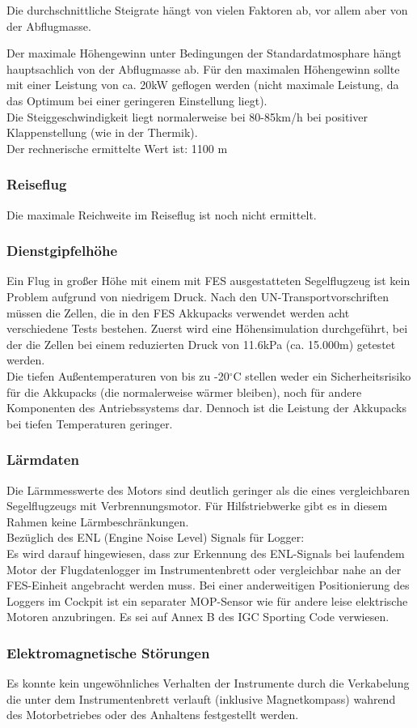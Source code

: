 Die durchschnittliche Steigrate hängt von vielen Faktoren ab, vor allem aber von der Abflugmasse.

Der maximale Höhengewinn unter Bedingungen der Standardatmosphare hängt hauptsachlich von der Abflugmasse ab. Für den maximalen Höhengewinn sollte mit einer Leistung von ca. 20kW geflogen werden (nicht maximale Leistung, da das Optimum bei einer geringeren Einstellung liegt).\\ 
Die Steiggeschwindigkeit liegt normalerweise bei 80-85km/h bei positiver Klappenstellung (wie in der Thermik).\\
Der rechnerische ermittelte Wert ist: 1100 m 

\subsubsection{Reiseflug}
Die maximale Reichweite im Reiseflug ist noch nicht ermittelt. 

\subsubsection{Dienstgipfelhöhe}
Ein Flug in großer Höhe mit einem mit FES ausgestatteten Segelflugzeug ist kein Problem aufgrund von niedrigem Druck. Nach den UN-Transportvorschriften müssen die Zellen, die in den FES Akkupacks verwendet werden acht verschiedene Tests bestehen. Zuerst wird eine Höhensimulation durchgeführt, bei der die Zellen bei einem reduzierten Druck von 11.6kPa (ca. 15.000m) getestet werden.\\

Die tiefen Außentemperaturen von bis zu -20$^\circ$C stellen weder ein Sicherheitsrisiko für
die Akkupacks (die normalerweise wärmer bleiben), noch für andere Komponenten des Antriebssystems dar. Dennoch ist die Leistung der Akkupacks bei tiefen Temperaturen geringer.

\subsubsection{Lärmdaten} 
Die Lärmmesswerte des Motors sind deutlich geringer als die eines vergleichbaren Segelflugzeugs mit Verbrennungsmotor.
Für Hilfstriebwerke gibt es in diesem Rahmen keine Lärmbeschränkungen.\\

Bezüglich des ENL (Engine Noise Level) Signals für Logger:\\
Es wird darauf hingewiesen, dass zur Erkennung des ENL-Signals bei laufendem Motor der Flugdatenlogger im Instrumentenbrett oder vergleichbar nahe an der FES-Einheit angebracht werden muss. Bei einer anderweitigen Positionierung des Loggers im
Cockpit ist ein separater MOP-Sensor wie für andere leise elektrische Motoren anzubringen.
Es sei auf Annex B des IGC Sporting Code verwiesen.

\subsubsection{Elektromagnetische Störungen}
Es konnte kein ungewöhnliches Verhalten der Instrumente durch die Verkabelung die unter dem Instrumentenbrett verlauft (inklusive Magnetkompass) wahrend des Motorbetriebes oder des Anhaltens festgestellt werden.



